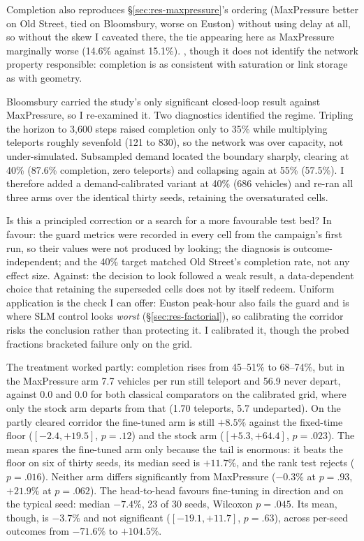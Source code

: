 Completion also reproduces \S\ref{sec:res-maxpressure}'s ordering (MaxPressure
better on Old Street, tied on Bloomsbury, worse on Euston) without using
delay at all, so without the skew I caveated there, the tie
appearing here as MaxPressure marginally worse (14.6\% against 15.1\%). , though it does not identify the network property
responsible: completion is as consistent with saturation or link storage
as with geometry.

Bloomsbury carried the study's only significant closed-loop
result against MaxPressure, so I re-examined it. Two diagnostics
identified the regime. Tripling the horizon to 3{,}600 steps raised completion only to
35\% while multiplying teleports roughly sevenfold (121 to 830), so the
network was over capacity, not under-simulated. Subsampled demand
located the boundary sharply, clearing at 40\% (87.6\% completion, zero
teleports) and collapsing again at 55\% (57.5\%). I therefore added a
demand-calibrated variant at 40\% (686 vehicles) and re-ran all three
arms over the identical thirty seeds, retaining the oversaturated
cells.

Is this a principled correction or a search for a more favourable test
bed? In favour: the guard metrics were recorded in every cell
from the campaign's first run, so their values were not produced by
looking; the diagnosis is outcome-independent; and the 40\% target matched
Old Street's completion rate, not any effect size. Against: the decision to look followed a weak result, a
data-dependent choice that retaining the superseded cells does not by
itself redeem. Uniform application is the check I can offer: Euston peak-hour also
fails the guard and is where SLM control looks \emph{worst}
(\S\ref{sec:res-factorial}), so calibrating the corridor risks the
conclusion rather than protecting it. I calibrated it, though the probed
fractions bracketed failure only on the grid.

 The treatment
worked partly: completion rises from 45--51\% to 68--74\%, but in the
MaxPressure arm 7.7 vehicles per run still teleport and 56.9 never depart,
against 0.0 and 0.0 for both classical comparators on the calibrated grid,
where only the stock arm departs from that (1.70 teleports, 5.7
undeparted). On the partly cleared corridor the fine-tuned arm is
still $+8.5\%$ against the fixed-time floor ($[-2.4, +19.5]$, $p{=}.12$)
and the stock arm  ($[+5.3, +64.4]$, $p{=}.023$). The
mean spares the fine-tuned arm only because the tail is enormous: it beats
the floor on six of thirty seeds, its median seed is $+11.7\%$, and the
rank test rejects ($p{=}.016$). Neither arm differs significantly from
MaxPressure ($-0.3\%$ at $p{=}.93$, $+21.9\%$ at $p{=}.062$). The
head-to-head favours fine-tuning in direction and on the typical seed:
median $-7.4\%$, 23 of 30 seeds, Wilcoxon $p{=}.045$. Its mean, though,
is $-3.7\%$ and not significant ($[-19.1, +11.7]$, $p{=}.63$), across
per-seed outcomes from $-71.6\%$ to $+104.5\%$.

